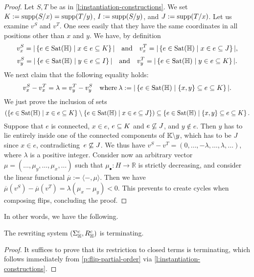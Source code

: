 \begin{proof}
Let $S,T$ be as in \cref{l:instantiation-constructions}. 
We set $K:=\operatorname{supp}(S/x)=\operatorname{supp}(T/y)$, $I:=\operatorname{supp}(S/y)$, and $J:=\operatorname{supp}(T/x)$.
Let us examine $v^S$ and $v^T$. 
One sees easily that they have the same coordinates in all positions other than $x$ and $y$. 
We have, by definition
$$ v^S_x  = |\left\{e\in{\operatorname{Sat}}({\mathbb H}) \mid x\in e\subseteq K\right\}| \quad \text{and} \quad v^T_x  = |\left\{e\in{\operatorname{Sat}}({\mathbb H}) \mid x\in e\subseteq J\right\}|, $$
$$ v^S_y  = |\left\{e\in{\operatorname{Sat}}({\mathbb H}) \mid y\in e\subseteq I\right\}| \quad \text{and} \quad v^T_y  = |\left\{e\in{\operatorname{Sat}}({\mathbb H}) \mid y\in e\subseteq K\right\}|.$$
We next claim that the following equality holds:
$$v^S_x  - v^T_x  = \lambda = 
v^T_y - v^S_y \quad\textrm{where}\: \lambda:= |\left\{e\in{\operatorname{Sat}}({\mathbb H}) \mid \left\{x,y\right\}\subseteq e\subseteq K\right\}|.$$
We just prove the inclusion of sets
$$\left(\left\{e\in{\operatorname{Sat}}({\mathbb H}) \mid x\in e\subseteq K\right\}\setminus\left\{e\in{\operatorname{Sat}}({\mathbb H}) \mid x\in e\subseteq J\right\}\right)
\subseteq\left\{e\in{\operatorname{Sat}}({\mathbb H}) \mid \left\{x,y\right\}\subseteq e\subseteq K\right\}.$$
Suppose that $e$ is connected, $x\in e$, $e\subseteq K$ and $e\not\subseteq J$, and $y\not\in e$. Then $y$ has to lie entirely inside one of the connected components of ${\mathbb K}\backslash y$, which has to be $J$ since $x\in e$, contradicting~$e\not\subseteq J$.
We thus have
$v^S - v^T = (0,\ldots,-\lambda,\ldots,\lambda,\ldots)$, where $\lambda$ is a positive integer.
Consider now an arbitrary vector $\mu=(\ldots,\mu_y,\ldots,\mu_x,\ldots)$ such that $\mu_{\bullet}:H\rightarrow\mathbb{R}$ is strictly decreasing, and consider the linear functional $\overline{\mu}:=\langle -,\mu\rangle$. 
Then we have 
$\overline{\mu}(v^S)- \overline{\mu}(v^T)=\lambda(\mu_x-\mu_y)<0$. This prevents to create cycles when composing flips, concluding the proof.
\end{proof}

In other words, we have the following.

\begin{thm}
  \label{thm:termination}
  The rewriting system $(\Sigma_{\mathbb H}^c,R_{\mathbb H}^c)$ is terminating.
\end{thm}

\begin{proof}
  It suffices to prove that its restriction to closed terms is terminating, which follows immediately from \cref{p:flip-partial-order} via \cref{l:instantiation-constructions}.
\end{proof}

